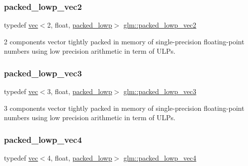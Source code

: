 \subsubsection{\texorpdfstring{packed\+\_\+lowp\+\_\+vec2}{packed\_lowp\_vec2}}
{\footnotesize\ttfamily typedef \hyperlink{structglm_1_1vec}{vec}$<$2, float, \hyperlink{namespaceglm_a36ed105b07c7746804d7fdc7cc90ff25ac36a4bd74559be2c0b65bc48e5953b8b}{packed\+\_\+lowp}$>$ \hyperlink{group__gtc__type__aligned_ga5457fdfd08276277a86cb27e1da6aa9c}{glm\+::packed\+\_\+lowp\+\_\+vec2}}



2 components vector tightly packed in memory of single-\/precision floating-\/point numbers using low precision arithmetic in term of U\+L\+Ps. 

\mbox{\label{group__gtc__type__aligned_ga64f20313965454ec7bd89f62ea4946ba}} 
\subsubsection{\texorpdfstring{packed\+\_\+lowp\+\_\+vec3}{packed\_lowp\_vec3}}
{\footnotesize\ttfamily typedef \hyperlink{structglm_1_1vec}{vec}$<$3, float, \hyperlink{namespaceglm_a36ed105b07c7746804d7fdc7cc90ff25ac36a4bd74559be2c0b65bc48e5953b8b}{packed\+\_\+lowp}$>$ \hyperlink{group__gtc__type__aligned_ga64f20313965454ec7bd89f62ea4946ba}{glm\+::packed\+\_\+lowp\+\_\+vec3}}



3 components vector tightly packed in memory of single-\/precision floating-\/point numbers using low precision arithmetic in term of U\+L\+Ps. 

\mbox{\label{group__gtc__type__aligned_ga35756405558e0f3cd7d194f07d557276}} 
\subsubsection{\texorpdfstring{packed\+\_\+lowp\+\_\+vec4}{packed\_lowp\_vec4}}
{\footnotesize\ttfamily typedef \hyperlink{structglm_1_1vec}{vec}$<$4, float, \hyperlink{namespaceglm_a36ed105b07c7746804d7fdc7cc90ff25ac36a4bd74559be2c0b65bc48e5953b8b}{packed\+\_\+lowp}$>$ \hyperlink{group__gtc__type__aligned_ga35756405558e0f3cd7d194f07d557276}{glm\+::packed\+\_\+lowp\+\_\+vec4}}




